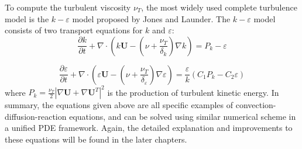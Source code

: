 To compute the turbulent viscosity $\nu_T$, the most widely used complete turbulence model is the $k-\varepsilon$ model proposed by Jones and Launder\cite{}. The $k-\varepsilon$ model consists of two transport equations for $k$ and $\varepsilon$:
\begin{equation} 
\frac{\partial k}{\partial t}
+\nabla\cdot(k\mathbf{U}
-(\nu+\frac{\nu_T}{\delta_k})\nabla k) 
= P_k - \varepsilon
\label{eq:k_eqn} 
\end{equation}

\begin{equation} 
\frac{\partial
\varepsilon}{\partial t}+\nabla\cdot(\varepsilon \mathbf{U}
-(\nu+\frac{\nu_T}{\delta_\varepsilon})\nabla \varepsilon)
=\frac{\varepsilon}{k}(C_1P_k-C_2\varepsilon) \label{eq:eps_eqn} \end{equation}
where $P_k = \frac{\nu_T}{2}|\nabla \mathbf{U} + \nabla \mathbf{U}^T|^2$ is the production of turbulent kinetic energy. In summary, the equations given above are all specific examples of convection-diffusion-reaction equations, and can be solved using similar numerical scheme in a unified PDE framework. Again, the detailed explanation and improvements to these equations will be found in the later chapters.

